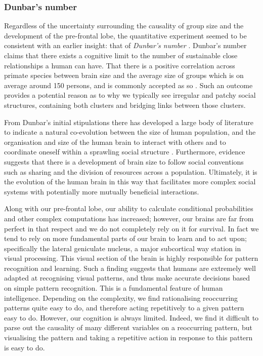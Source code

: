 \subsubsection{Dunbar's number}

Regardless of the uncertainty surrounding the causality of group size and the development of the pre-frontal lobe, the quantitative experiment seemed to be consistent with an earlier insight: that of \textit{Dunbar's number}  \citet{Dunbar1992}. Dunbar's number claims that there exists a cognitive limit to the number of sustainable close relationships a human can have. That there is a positive correlation across primate species between brain size and the average size of groups which is on average around 150 persons, and is commonly accepted as so \citep{Hernando2010}. Such an outcome provides a potential reason as to why we typically see irregular and patchy social structures, containing both clusters and bridging links between those clusters.

From Dunbar's initial stipulations there has developed a large body of literature to indicate a natural co-evolution between the size of human population, and the organisation and size of the human brain to interact with others and to coordinate oneself within a sprawling social structure \citep{David-BarrettDunbar2013, Dunbar2014a}. Furthermore, evidence suggests that there is a development of brain size to follow social conventions such as sharing and the division of resources across a population. Ultimately, it is the evolution of the human brain in this way that facilitates more complex social systems with potentially more mutually beneficial interactions.

Along with our pre-frontal lobe, our ability to calculate conditional probabilities and other complex computations has increased; however, our brains are far from perfect in that respect and we do not completely rely on it for survival. In fact we tend to rely on more fundamental parts of our brain to learn and to act upon; specifically the lateral geniculate nucleus, a major subcortical way station in visual processing. This visual section of the brain is highly responsible for pattern recognition and learning. Such a finding suggests that humans are extremely well adapted at recognising visual patterns, and thus make accurate decisions based on simple pattern recognition. This is a fundamental feature of human intelligence. Depending on the complexity, we find rationalising reoccurring patterns quite easy to do, and therefore acting repetitively to a given pattern easy to do. However, our cognition is always limited. Indeed, we find it difficult to parse out the causality of many different variables on a reoccurring pattern, but visualising the pattern and taking a repetitive action in response to this pattern is easy to do.

